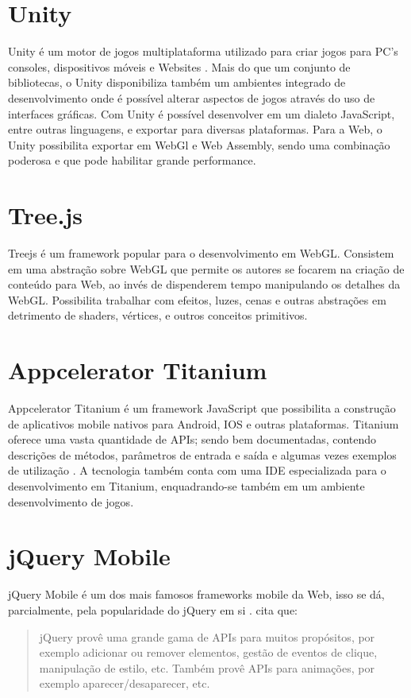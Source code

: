 \section{Unity}

Unity é um motor de jogos multiplataforma utilizado para criar jogos
para PC's consoles, dispositivos móveis e Websites \autocite{unity}.
Mais do que um conjunto de bibliotecas, o Unity disponibiliza também
um ambientes integrado de desenvolvimento onde é possível alterar
aspectos de jogos através do uso de interfaces gráficas. Com Unity é possível
desenvolver em um dialeto JavaScript, entre outras linguagens, e
exportar para diversas plataformas. Para a Web, o Unity possibilita
exportar em WebGl e Web Assembly, sendo uma combinação poderosa e que
pode habilitar grande performance.

\section{Tree.js}

Treejs é um framework popular para o desenvolvimento em WebGL.
Consistem em uma abstração sobre WebGL que permite os autores se
focarem na criação de conteúdo para Web, ao invés de dispenderem
tempo manipulando os detalhes da WebGL. Possibilita trabalhar com
efeitos, luzes, cenas e outras abstrações em detrimento de shaders,
vértices, e outros conceitos primitivos.

\section{Appcelerator Titanium}

Appcelerator Titanium é um framework JavaScript que possibilita a
construção de aplicativos mobile nativos para Android, IOS e outras
plataformas. Titanium oferece uma vasta quantidade de APIs; sendo
bem documentadas, contendo descrições de métodos, parâmetros de
entrada e saída e algumas vezes exemplos de utilização \autocite[p.
2]{crossPlatformAppsAnimations}. A tecnologia também conta com uma IDE
especializada para o desenvolvimento em Titanium, enquadrando-se também
em um ambiente desenvolvimento de jogos.

\section{jQuery Mobile}

jQuery Mobile é um dos mais famosos frameworks mobile da Web,
isso se dá, parcialmente, pela popularidade do jQuery em si
\autocite[p. 14]{viabilityBusinessApplications}. \citet[p.
2]{crossPlatformAppsAnimations} cita que:
\begin{quote}
jQuery provê uma grande gama de APIs para muitos propósitos, por
exemplo adicionar ou remover elementos, gestão de eventos de clique,
manipulação de estilo, etc. Também provê APIs para animações, por
exemplo aparecer/desaparecer, etc.
\end{quote}


